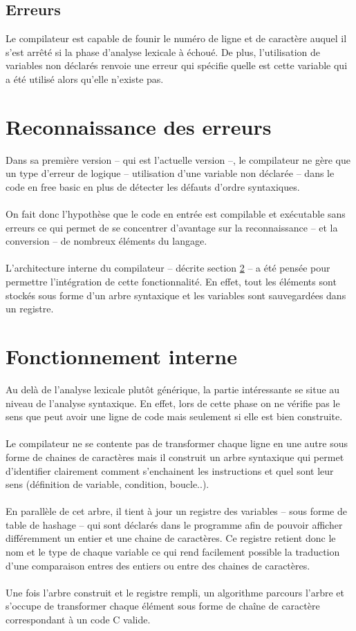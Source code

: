\documentclass{article}
\begin{document}
\subsection{Erreurs}
Le compilateur est capable de founir le numéro de ligne et de caractère auquel il s'est arrêté si la phase
d'analyse lexicale à échoué. De plus, l'utilisation de variables non déclarés renvoie une erreur qui spécifie
quelle est cette variable qui a été utilisé alors qu'elle n'existe pas.
	
\section{Reconnaissance des erreurs}
Dans sa première version -- qui est l'actuelle version --, le compilateur ne gère que un type 
d'erreur de logique -- utilisation d'une variable non déclarée -- dans le code 
en free basic en plus de détecter les défauts d'ordre syntaxiques.
\\\\
On fait donc l'hypothèse que le code en entrée est compilable et exécutable sans erreurs
ce qui permet de se concentrer d'avantage sur la reconnaissance -- et la conversion -- 
de nombreux éléments du langage.
\\\\
L'architecture interne du compilateur -- décrite section \ref{sec:Fonctionnement} -- a été pensée pour permettre
l'intégration de cette fonctionnalité. En effet, tout les éléments sont stockés sous forme
d'un arbre syntaxique et les variables sont sauvegardées dans un registre.
	
\section{Fonctionnement interne}\label{sec:Fonctionnement}
Au delà de l'analyse lexicale plutôt générique, la partie intéressante se situe au niveau
de l'analyse syntaxique. En effet, lors de cette phase on ne vérifie pas le sens que peut avoir 
une ligne de code mais 
seulement si elle est bien construite. 
\\\\
Le compilateur ne se contente pas de transformer 
chaque ligne en une autre sous forme de chaines de caractères mais il construit un 
arbre syntaxique qui permet d'identifier clairement comment s'enchainent les instructions
et quel sont leur sens (définition de variable, condition, boucle..).
\\\\
En parallèle de cet arbre, il tient à jour un registre des variables -- sous forme de 
table de hashage -- qui sont déclarés dans le programme afin de pouvoir afficher 
différemment un entier et une chaine de caractères. Ce registre retient donc le nom et le
type de chaque variable ce qui rend facilement possible la traduction d'une comparaison 
entres des entiers ou entre des chaines de caractères.
\\\\
Une fois l'arbre construit et le registre rempli, un algorithme parcours l'arbre et 
s'occupe de transformer chaque élément sous forme de chaîne de caractère correspondant
à un code C valide.
\end{document}

